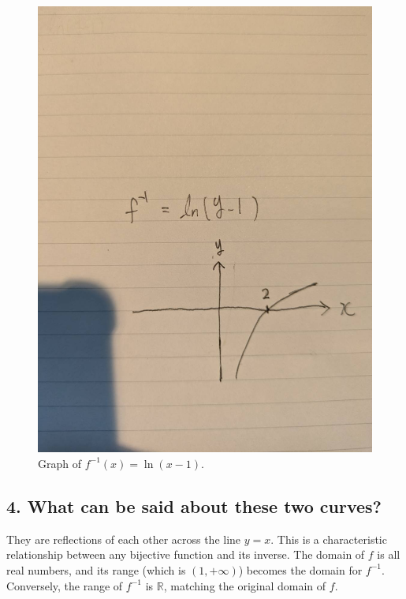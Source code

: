 \documentclass[12pt]{article}
\begin{document}
\begin{figure}[ht]
\begin{minipage}[t]{0.45\textwidth}
    \includegraphics[width=\textwidth]{images/ln(y-1).jpg}
    \caption{Graph of $f^{-1}(x) = \ln(x - 1)$.}
    \label{fig:ln-of-x-minus-1}
  \end{minipage}
\end{figure}

\subsection*{4. What can be said about these two curves?}

They are reflections of each other across the line $y = x$. This is a characteristic relationship between any bijective function and its inverse. The domain of $f$ is all real numbers, and its range (which is $(1,+\infty)$) becomes the domain for $f^{-1}$. Conversely, the range of $f^{-1}$ is $\mathbb{R}$, matching the original domain of $f$.
\end{document}
